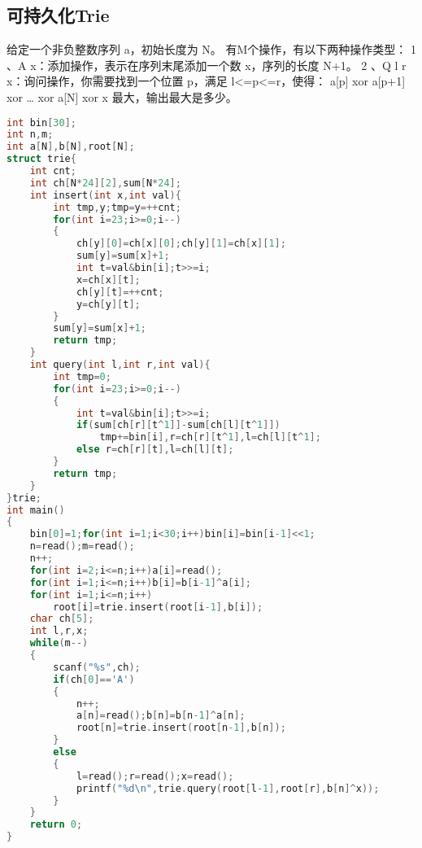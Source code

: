 \subsection{可持久化Trie}
给定一个非负整数序列 {a}，初始长度为 N。
有M个操作，有以下两种操作类型：
1 、A x：添加操作，表示在序列末尾添加一个数 x，序列的长度 N+1。
2 、Q l r x：询问操作，你需要找到一个位置 p，满足 l<=p<=r，使得：
a[p] xor a[p+1] xor … xor a[N] xor x 最大，输出最大是多少。
\begin{lstlisting}[language=C]
int bin[30];
int n,m;
int a[N],b[N],root[N];
struct trie{
	int cnt;
	int ch[N*24][2],sum[N*24];
	int insert(int x,int val){
		int tmp,y;tmp=y=++cnt;
		for(int i=23;i>=0;i--)
		{
			ch[y][0]=ch[x][0];ch[y][1]=ch[x][1];
			sum[y]=sum[x]+1;
			int t=val&bin[i];t>>=i;
			x=ch[x][t];
			ch[y][t]=++cnt;
			y=ch[y][t];
		}
		sum[y]=sum[x]+1;
		return tmp;
	}
	int query(int l,int r,int val){
		int tmp=0;
		for(int i=23;i>=0;i--)
		{
			int t=val&bin[i];t>>=i;
			if(sum[ch[r][t^1]]-sum[ch[l][t^1]])
				tmp+=bin[i],r=ch[r][t^1],l=ch[l][t^1];
			else r=ch[r][t],l=ch[l][t];
		}
		return tmp;
	}
}trie;
int main()
{
	bin[0]=1;for(int i=1;i<30;i++)bin[i]=bin[i-1]<<1;
	n=read();m=read();
	n++;
	for(int i=2;i<=n;i++)a[i]=read();
	for(int i=1;i<=n;i++)b[i]=b[i-1]^a[i];
	for(int i=1;i<=n;i++)
		root[i]=trie.insert(root[i-1],b[i]);
	char ch[5];
	int l,r,x;
	while(m--)
	{
		scanf("%s",ch);
		if(ch[0]=='A')
		{
			n++;
			a[n]=read();b[n]=b[n-1]^a[n];
			root[n]=trie.insert(root[n-1],b[n]);
		}
		else 
		{
			l=read();r=read();x=read();
			printf("%d\n",trie.query(root[l-1],root[r],b[n]^x));
		}
	}
	return 0;
}
\end{lstlisting}